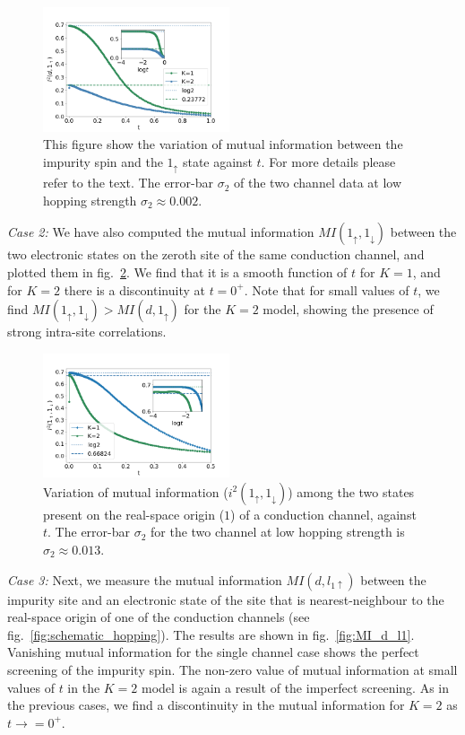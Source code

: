\documentclass{iopart}
\begin{document}
\begin{figure}[!htpb]
\includegraphics[width=0.49\textwidth]{AI2ch12d1up}
\caption{This figure show the variation of mutual information between the impurity spin and the $1_{\uparrow}$ state against $t$. For more details please refer to the text. The error-bar $\sigma_2$ of the two channel data at low hopping strength $\sigma_2\approx 0.002$.}
\label{fig:MI_imp_1_vs_t_K}
\end{figure}

\par\textit{Case 2:} We have also computed the mutual information $MI(1_{\uparrow},1_{\downarrow})$  between the two electronic states on the zeroth site of the same conduction channel, and plotted them in fig.~\ref{fig:MI_1_2_vs_t_K}. We find that it is a smooth function of $t$ for \(K=1\), and for \(K=2\) there is a discontinuity at $t=0^{+}$. Note that for small values of \(t\), we find  $MI(1_{\uparrow},1_{\downarrow})>MI(d,1_{\uparrow})$ for the \(K=2\) model, showing the presence of strong intra-site correlations.

\begin{figure}[!htpb]
\includegraphics[width=0.49\textwidth]{AI2ch121up1down}
\caption{Variation of mutual information ($i^2(1_{\uparrow},1_{\downarrow})$) among the two states present on the real-space origin ($1$) of a conduction channel, against $t$. The error-bar $\sigma_2$ for the two channel at low hopping strength is $\sigma_2\approx 0.013$.}
\label{fig:MI_1_2_vs_t_K}
\end{figure}

\par \textit{Case 3:} Next, we measure the mutual information $MI(d,l_{1\uparrow})$ between the impurity site and an electronic state of the site that is nearest-neighbour to the real-space origin of one of the conduction channels (see fig.~\ref{fig:schematic_hopping}).  The results are shown in fig.~\ref{fig:MI_d_l1}. Vanishing mutual information for the single channel case shows the perfect screening of the impurity spin. The non-zero value of mutual information at small values of $t$ in the \(K=2\) model is again a result of the imperfect screening. As in the previous cases, we find a discontinuity in the mutual information for \(K=2\) as $t \to =0^+$.
\end{document}
